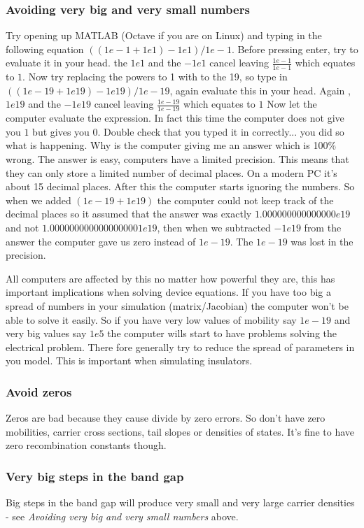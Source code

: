 \subsubsection{Avoiding very big and very small numbers} \label{ssec:big_small_numbers}
Try opening up MATLAB (Octave if you are on Linux) and typing in the following equation $((1e-1+1e1)-1e1)/1e-1$. Before pressing enter, try to evaluate it in your head. the $1e1$ and the $-1e1$ cancel leaving $\frac{1e-1}{1e-1}$ which equates to $1$.  Now try replacing the powers to 1 with to the 19, so type in $((1e-19+1e19)-1e19)/1e-19$, again evaluate this in your head.  Again , $1e19$ and the $-1e19$ cancel leaving $\frac{1e-19}{1e-19}$ which equates to $1$  Now let the computer evaluate the expression.  In fact this time the computer does not give you $1$ but gives you $0$. Double check that you typed it in correctly... you did so what is happening. Why is the computer giving me an answer which is 100\% wrong.  The answer is easy, computers have a limited precision. This means that they can only store a limited number of decimal places. On a modern PC it's about 15 decimal places. After this the computer starts ignoring the numbers.  So when we added $(1e-19+1e19)$ the computer could not keep track of the decimal places so it assumed that the answer was exactly $1.000000000000000e19$ and not $1.0000000000000000001e19$, then when we subtracted $-1e19$ from the answer the computer gave us zero instead of $1e-19$.  The $1e-19$ was lost in the precision.

All computers are affected by this no matter how powerful they are, this has important implications when solving device equations.  If you have too big a spread of numbers in your simulation (matrix/Jacobian) the computer won't be able to solve it easily.  So if you have very low values of mobility say $1e-19$ and very big values say $1e5$ the computer wills start to have problems solving the electrical problem. There fore generally try to reduce the spread of parameters in you model. This is important when simulating insulators.

\subsubsection{Avoid zeros}
Zeros are bad because they cause divide by zero errors. So don't have zero mobilities, carrier cross sections, tail slopes or densities of states.  It's fine to have zero recombination constants though.

\subsubsection{Very big steps in the band gap}
Big steps in the band gap will produce very small and very large carrier densities - see \emph{Avoiding very big and very small numbers} above.

